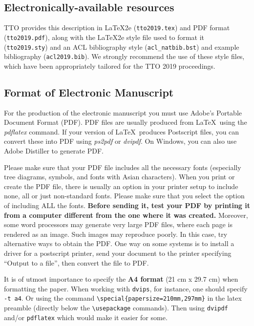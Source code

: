 \documentclass[11pt,a4paper]{article}
\begin{document}
\subsection{Electronically-available resources}

TTO provides this description in \LaTeX2e{} (\texttt{\small tto2019.tex}) and PDF
format (\texttt{\small tto2019.pdf}), along with the \LaTeX2e{} style file used to
format it (\texttt{\small tto2019.sty}) and an ACL bibliography style (\texttt{\small acl\_natbib.bst})
and example bibliography (\texttt{\small acl2019.bib}).
 We
strongly recommend the use of these style files, which have been
appropriately tailored for the TTO 2019 proceedings.

\subsection{Format of Electronic Manuscript}
\label{sect:pdf}

For the production of the electronic manuscript you must use Adobe's
Portable Document Format (PDF). PDF files are usually produced from
\LaTeX\ using the \textit{pdflatex} command. If your version of
\LaTeX\ produces Postscript files, you can convert these into PDF
using \textit{ps2pdf} or \textit{dvipdf}. On Windows, you can also use
Adobe Distiller to generate PDF.

Please make sure that your PDF file includes all the necessary fonts
(especially tree diagrams, symbols, and fonts with Asian
characters). When you print or create the PDF file, there is usually
an option in your printer setup to include none, all or just
non-standard fonts.  Please make sure that you select the option of
including ALL the fonts. \textbf{Before sending it, test your PDF by
  printing it from a computer different from the one where it was
  created.} Moreover, some word processors may generate very large PDF
files, where each page is rendered as an image. Such images may
reproduce poorly. In this case, try alternative ways to obtain the
PDF. One way on some systems is to install a driver for a postscript
printer, send your document to the printer specifying ``Output to a
file'', then convert the file to PDF.

It is of utmost importance to specify the \textbf{A4 format} (21 cm
x 29.7 cm) when formatting the paper. When working with
\texttt{dvips}, for instance, one should specify \texttt{-t a4}.
Or using the command \verb|\special{papersize=210mm,297mm}| in the latex
preamble (directly below the \verb|\usepackage| commands). Then using 
\texttt{dvipdf} and/or \texttt{pdflatex} which would make it easier for some.
\end{document}
